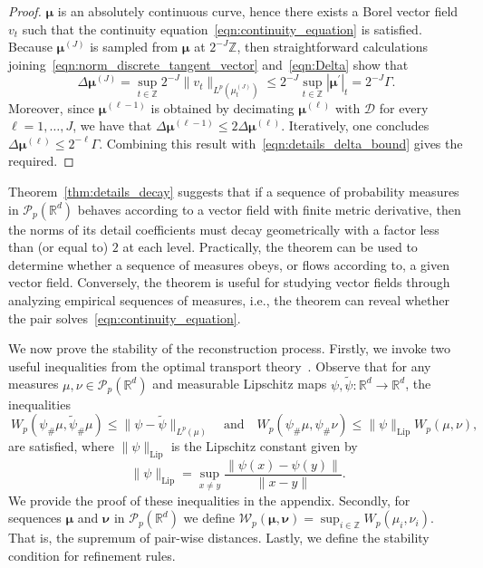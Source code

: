 \documentclass[12pt]{amsart}
\begin{document}
\begin{proof}
    $\boldsymbol{\mu}$ is an absolutely continuous curve, hence there exists a Borel vector field $v_t$ such that the continuity equation~\eqref{eqn:continuity_equation} is satisfied. Because $\boldsymbol{\mu}^{(J)}$ is sampled from $\boldsymbol{\mu}$ at $2^{-J}\mathbb{Z}$, then straightforward calculations joining~\eqref{eqn:norm_discrete_tangent_vector} and~\eqref{eqn:Delta} show that
    \begin{equation*}
        \Delta\boldsymbol{\mu}^{(J)}=\sup_{t\in\mathbb{Z}} 2^{-J} \|v_t\|_{L^p(\mu^{(J)}_t)} \leq 2^{-J} \sup_{t\in\mathbb{Z}} |\boldsymbol{\mu}^\prime|_t=2^{-J} \Gamma.
    \end{equation*}
    Moreover, since $\boldsymbol{\mu}^{(\ell-1)}$ is obtained by decimating $\boldsymbol{\mu}^{(\ell)}$ with $\mathcal{D}$ for every $\ell=1,\dots, J$, we have that $\Delta\boldsymbol{\mu}^{(\ell-1)}\leq 2 \Delta\boldsymbol{\mu}^{(\ell)}$. Iteratively, one concludes $\Delta\boldsymbol{\mu}^{(\ell)}\leq 2^{-\ell}\Gamma$. Combining this result with~\eqref{eqn:details_delta_bound} gives the required.
\end{proof}

Theorem~\ref{thm:details_decay} suggests that if a sequence of probability measures in $\mathcal{P}_p(\mathbb{R}^d)$ behaves according to a vector field with finite metric derivative, then the norms of its detail coefficients must decay geometrically with a factor less than (or equal to) $2$ at each level. Practically, the theorem can be used to determine whether a sequence of measures obeys, or flows according to, a given vector field. Conversely, the theorem is useful for studying vector fields through analyzing empirical sequences of measures, i.e., the theorem can reveal whether the pair solves~\eqref {eqn:continuity_equation}.

We now prove the stability of the reconstruction process. Firstly, we invoke two useful inequalities from the optimal transport theory~\cite{panaretos2020invitation, peyre2019computational, villani2021topics}. Observe that for any measures $\mu,\nu\in\mathcal{P}_p(\mathbb{R}^d)$ and measurable Lipschitz maps $\psi, \widetilde{\psi}:\mathbb{R}^d\to\mathbb{R}^d$, the inequalities
\begin{equation}~\label{eqn:stability_inequalities}
    W_p(\psi_\#\mu,\widetilde{\psi}_\#\mu) \leq \|\psi-\widetilde{\psi}\|_{L^p(\mu)} \quad \text{and} \quad W_p(\psi_\#\mu,\psi_\#\nu) \leq \|\psi\|_{\text{Lip}}W_p(\mu, \nu),
\end{equation}
are satisfied, where $\|\psi\|_{\text{Lip}}$ is the Lipschitz constant given by
\begin{equation}~\label{eqn:Lipschitz_norm}
    \|\psi\|_{\text{Lip}} = \sup_{x\neq y}\frac{\|\psi(x)-\psi(y)\|}{\|x-y\|}.
\end{equation}
We provide the proof of these inequalities in the appendix. Secondly, for sequences $\boldsymbol{\mu}$ and $\boldsymbol{\nu}$ in $\mathcal{P}_p(\mathbb{R}^d)$ we define $\mathcal{W}_p(\boldsymbol{\mu}, \boldsymbol{\nu})=\sup_{i\in\mathbb{Z}}W_p(\mu_i, \nu_i)$. That is, the supremum of pair-wise distances. Lastly, we define the stability condition for refinement rules.
\end{document}
